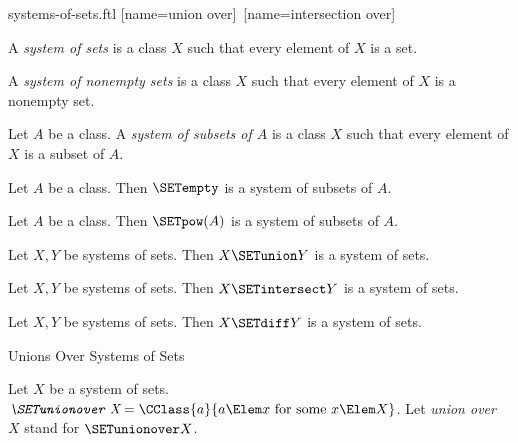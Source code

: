 \documentclass{stex}
\begin{document}
\begin{smodule}{systems-of-sets.ftl}
[name=union over]{\bigcup\,}
[name=intersection over]{\bigcap\,}

\begin{definition}[forthel,for=system of sets]
  A \emph{system of sets} is a class $X$ such that every element of $X$ is a set.
\end{definition}

\begin{definition}[forthel,for=system of nonempty sets]
  A \emph{system of nonempty sets} is a class $X$ such that every element of $X$ is a nonempty set.
\end{definition}

\begin{definition}[forthel,for=system of subsets]
  Let $A$ be a class.
  A \emph{system of subsets of $A$} is a class $X$ such that every element of $X$ is a subset of $A$.
\end{definition}

\begin{proposition}[forthel]
  Let $A$ be a class.
  Then $\SETempty$ is a system of subsets of $A$.
\end{proposition}

\begin{proposition}[forthel]
  Let $A$ be a class.
  Then $\SETpow(A)$ is a system of subsets of $A$.
\end{proposition}

\begin{proposition}[forthel]
  Let $X, Y$ be systems of sets.
  Then $X \SETunion Y$ is a system of sets.
\end{proposition}

\begin{proposition}[forthel]
  Let $X, Y$ be systems of sets.
  Then $X \SETintersect Y$ is a system of sets.
\end{proposition}

\begin{proposition}[forthel]
  Let $X, Y$ be systems of sets.
  Then $X \SETdiff Y$ is a system of sets.
\end{proposition}

\begin{sfragment}{Unions Over Systems of Sets}
  \begin{definition}[forthel,for=union over]
    Let $X$ be a system of sets.
    $\emph{\SETunionover X} = \CClass{a}{a \Elem x\text{ for some }x \Elem X}$.
    Let \emph{union over $X$} stand for $\SETunionover X$.
  \end{definition}


\end{sfragment}
\end{smodule}
\end{document}
